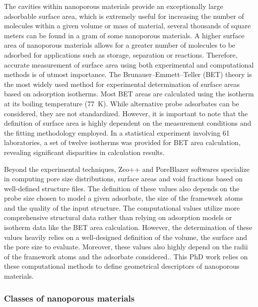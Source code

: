 \documentclass[main.tex]{subfiles}
\begin{document}
The cavities within nanoporous materials provide an exceptionally large adsorbable surface area, which is extremely useful for increasing the number of molecules within a given volume or mass of material, several thousands of square meters can be found in a gram of some nanoporous materials.\autocite{Farha_2012} A higher surface area of nanoporous materials allows for a greater number of molecules to be adsorbed for applications such as storage, separation or reactions. Therefore, accurate measurement of surface area using both experimental and computational methods is of utmost importance. The Brunauer–Emmett–Teller (BET) theory is the most widely used method for experimental determination of surface areas based on adsorption isotherms.\autocite{Detsi_2011} Most BET areas are calculated using the  isotherm at its boiling temperature (\SI{77}{\kelvin}). While alternative probe adsorbates can be considered, they are not standardized.\autocite{Tian_2017} However, it is important to note that the definition of surface area is highly dependent on the measurement conditions and the fitting methodology employed. In a statistical experiment involving 61 laboratories, a set of twelve isotherms was provided for BET area calculation, revealing significant disparities in calculation results.\autocite{Osterrieth_2022} 

Beyond the experimental techniques, Zeo++ and PoreBlazer softwares specialize in computing pore size distributions, surface areas and void fractions based on well-defined structure files.\autocite{Zeo++,PoreBlazer} The definition of these values also depends on the probe size chosen to model a given adsorbate, the size of the framework atoms and the quality of the input structure. The computational values utilize more comprehensive structural data rather than relying on adsorption models or isotherm data like the BET area calculation. However, the determination of these values heavily relies on a well-designed definition of the volume, the surface and the pore size to evaluate. Moreover, these values also highly depend on the radii of the framework atoms and the adsorbate considered.\autocite{Hung_2021}. This PhD work relies on these computational methods to define geometrical descriptors of nanoporous materials.

\subsubsection{Classes of nanoporous materials}
\end{document}
